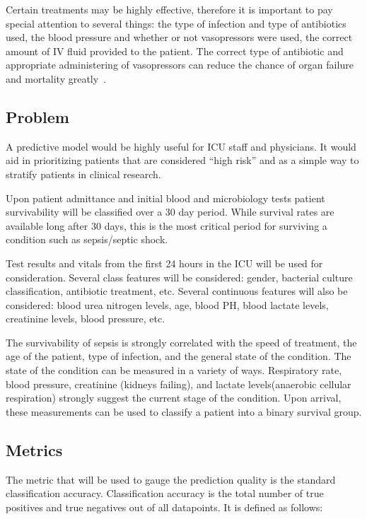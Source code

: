 \documentclass[11pt]{article}
\begin{document}
Certain treatments may be highly effective, therefore it is important to pay special attention to several things: the type of infection and type of antibiotics used, the blood pressure and whether or not vasopressors were used, the correct amount of IV fluid provided to the patient. The correct type of antibiotic and appropriate administering of vasopressors can reduce the chance of organ failure and mortality greatly~\cite{pressors}.


\subsection{Problem}

A predictive model would be highly useful for ICU staff and physicians. It would aid in prioritizing patients that are considered ``high risk'' and as a simple way to stratify patients in clinical research. 

Upon patient admittance and initial blood and microbiology tests patient survivability will be classified over a 30 day period. While survival rates are available long after 30 days, this is the most critical period for surviving a condition such as sepsis/septic shock. 

Test results and vitals from the first 24 hours in the ICU will be used for consideration. Several class features will be considered: gender, bacterial culture classification, antibiotic treatment, etc. Several continuous features will also be considered: blood urea nitrogen levels, age, blood PH, blood lactate levels, creatinine levels, blood pressure, etc.

The survivability of sepsis is strongly correlated with the speed of treatment, the age of the patient, type of infection, and the general state of the condition. The state of the condition can be measured in a variety of ways. Respiratory rate, blood pressure, creatinine (kidneys failing), and lactate levels(anaerobic cellular respiration) strongly suggest the current stage of the condition. Upon arrival, these measurements can be used to classify a patient into a binary survival group.

\subsection{Metrics}
The metric that will be used to gauge the prediction quality is the standard classification accuracy. Classification accuracy is the total number of true positives and true negatives out of all datapoints. It is defined as follows:
\end{document}
